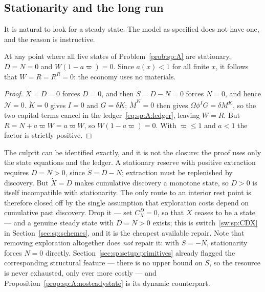 \subsection{Stationarity and the long run}\label{sec:sp:A:longrun}

It is natural to look for a steady state. The model as specified does not have one, and the reason is
instructive.

\begin{proposition}\label{prop:sp:A:nosteadystate}
At any point where all five states of Problem~\ref{prob:sp:A} are stationary, $D=N=0$ and
$W\left(1-a\varpi\right)=0$. Since $a(x)<1$ for all finite $x$, it follows that $W=R=R^R=0$: the
economy uses no materials.
\end{proposition}

\begin{proof}
$\dot X=D=0$ forces $D=0$, and then $\dot S=D-N=0$ forces $N=0$, and hence $\mathcal N=0$. $\dot K=0$
gives $I=0$ and $G=\delta K$; $\dot M^K=0$ then gives $\Omega\phi^IG=\delta M^K$, so the two capital
terms cancel in the ledger~\eqref{eq:sp:A:ledger}, leaving $W=R$. But $R=N+a\varpi W=a\varpi W$, so
$W\left(1-a\varpi\right)=0$. With $\varpi\le1$ and $a<1$ the factor is strictly positive.
\end{proof}

The culprit can be identified exactly, and it is not the closure: the proof uses only the state
equations and the ledger. A stationary reserve with positive extraction requires $D=N>0$, since
$\dot S=D-N$; extraction must be replenished by discovery. But $\dot X=D$ makes cumulative discovery a
monotone state, so $D>0$ is itself incompatible with stationarity. The only route to an interior rest
point is therefore closed off by the single assumption that exploration costs depend on cumulative
past discovery. Drop it --- set $C^D_X=0$, so that $X$ ceases to be a state --- and a genuine steady
state with $D=N>0$ exists; this is switch~\ref{sw:sp:CDX} in Section~\ref{sec:sp:schemes}, and it is
the cheapest available repair. Note that removing exploration altogether does \emph{not} repair it:
with $\dot S=-N$, stationarity forces $N=0$ directly. Section~\ref{sec:sp:setup:primitives} already
flagged the corresponding structural feature --- there is no upper bound on $S$, so the resource is
never exhausted, only ever more costly --- and Proposition~\ref{prop:sp:A:nosteadystate} is its
dynamic counterpart.

